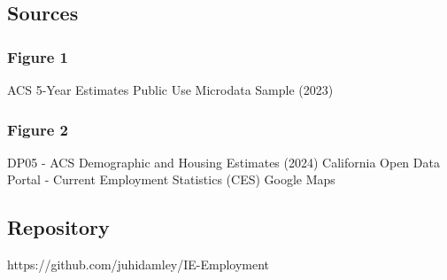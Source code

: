 \documentclass[12pt]{article}
\begin{document}
\subsection*{Sources}
\subsubsection*{Figure 1}
ACS 5-Year Estimates Public Use Microdata Sample (2023)

\subsubsection*{Figure 2}
DP05 - ACS Demographic and Housing Estimates (2024)
California Open Data Portal - Current Employment Statistics (CES)
Google Maps

\subsection*{Repository}
https://github.com/juhidamley/IE-Employment
\end{document}
